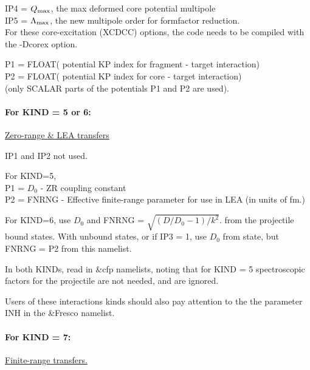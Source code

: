 \documentclass[11pt]{article}
\begin{document}
\begin{description}
IP4 = $Q_{\rm max}$, the max deformed core potential multipole\\
IP5 = $\Lambda_{\rm max}$, the new multipole order for formfactor reduction.\\
For these core-excitation (XCDCC) options, the code needs to be compiled with the -Dcorex option.

 P1  = FLOAT( potential KP index for fragment - target interaction) \\
 P2  = FLOAT( potential KP index for core     - target interaction) \\
        (only SCALAR parts of the potentials P1 and P2 are used).

\paragraph{For KIND = 5 or 6:}
\underline{Zero-range \& LEA transfers}

IP1 and IP2 not used.

For KIND=5,
\\  P1 = $D_0$    - ZR coupling constant
\\  P2 = FNRNG - Effective finite-range parameter for use
in LEA (in units of fm.)

For KIND=6, use $D_0$ and FNRNG = $\sqrt{(D/D_0 - 1)/k^2}$. from the projectile
bound states.  With unbound states, or if IP3 = 1,
use $D_0$ from state, but FNRNG = P2
from this namelist.

 In both KINDs, read in \&cfp namelists, noting that for KIND = 5
spectroscopic factors for the projectile are not needed, and are ignored.

Users of these interactions kinds should also pay attention to the
the parameter INH in the \&Fresco namelist.

\paragraph{For KIND = 7:}
\underline{Finite-range transfers.}



\end{description}
\end{document}
